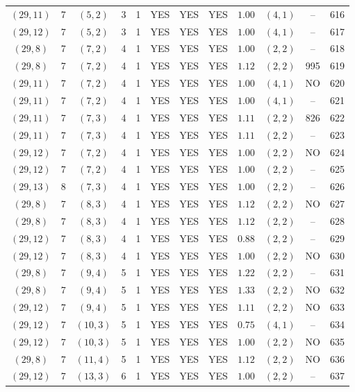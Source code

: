 \begin{longtable}{|c|c|c|c|c|c|c|c|c|c|c|c|}
$(29,11)$ & 7 & $(5,2)$ & 3 & 1 & YES & YES & YES & $1.00$ & $(4,1)$ & -- & 616\\
$(29,12)$ & 7 & $(5,2)$ & 3 & 1 & YES & YES & YES & $1.00$ & $(4,1)$ & -- & 617\\
$(29,8)$ & 7 & $(7,2)$ & 4 & 1 & YES & YES & YES & $1.00$ & $(2,2)$ & -- & 618\\
$(29,8)$ & 7 & $(7,2)$ & 4 & 1 & YES & YES & YES & $1.12$ & $(2,2)$ & 995 & 619\\
$(29,11)$ & 7 & $(7,2)$ & 4 & 1 & YES & YES & YES & $1.00$ & $(4,1)$ & NO & 620\\
$(29,11)$ & 7 & $(7,2)$ & 4 & 1 & YES & YES & YES & $1.00$ & $(4,1)$ & -- & 621\\
$(29,11)$ & 7 & $(7,3)$ & 4 & 1 & YES & YES & YES & $1.11$ & $(2,2)$ & 826 & 622\\
$(29,11)$ & 7 & $(7,3)$ & 4 & 1 & YES & YES & YES & $1.11$ & $(2,2)$ & -- & 623\\
$(29,12)$ & 7 & $(7,2)$ & 4 & 1 & YES & YES & YES & $1.00$ & $(2,2)$ & NO & 624\\
$(29,12)$ & 7 & $(7,2)$ & 4 & 1 & YES & YES & YES & $1.00$ & $(2,2)$ & -- & 625\\
$(29,13)$ & 8 & $(7,3)$ & 4 & 1 & YES & YES & YES & $1.00$ & $(2,2)$ & -- & 626\\
$(29,8)$ & 7 & $(8,3)$ & 4 & 1 & YES & YES & YES & $1.12$ & $(2,2)$ & NO & 627\\
$(29,8)$ & 7 & $(8,3)$ & 4 & 1 & YES & YES & YES & $1.12$ & $(2,2)$ & -- & 628\\
$(29,12)$ & 7 & $(8,3)$ & 4 & 1 & YES & YES & YES & $0.88$ & $(2,2)$ & -- & 629\\
$(29,12)$ & 7 & $(8,3)$ & 4 & 1 & YES & YES & YES & $1.00$ & $(2,2)$ & NO & 630\\
$(29,8)$ & 7 & $(9,4)$ & 5 & 1 & YES & YES & YES & $1.22$ & $(2,2)$ & -- & 631\\
$(29,8)$ & 7 & $(9,4)$ & 5 & 1 & YES & YES & YES & $1.33$ & $(2,2)$ & NO & 632\\
$(29,12)$ & 7 & $(9,4)$ & 5 & 1 & YES & YES & YES & $1.11$ & $(2,2)$ & NO & 633\\
$(29,12)$ & 7 & $(10,3)$ & 5 & 1 & YES & YES & YES & $0.75$ & $(4,1)$ & -- & 634\\
$(29,12)$ & 7 & $(10,3)$ & 5 & 1 & YES & YES & YES & $1.00$ & $(2,2)$ & NO & 635\\
$(29,8)$ & 7 & $(11,4)$ & 5 & 1 & YES & YES & YES & $1.12$ & $(2,2)$ & NO & 636\\
$(29,12)$ & 7 & $(13,3)$ & 6 & 1 & YES & YES & YES & $1.00$ & $(2,2)$ & -- & 637\\

\end{longtable}
